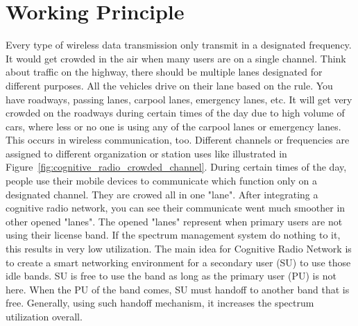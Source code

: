 \section{Working Principle}

Every type of wireless data transmission only transmit in a designated frequency. It would get crowded in the air when many users 
are on a single channel. Think about traffic on the highway, there should be multiple lanes designated for different purposes. 
All the vehicles drive on their lane based on the rule. You have roadways, passing lanes, carpool lanes, emergency lanes, etc. 
It will get very crowded on the roadways during certain times of the day due to high volume of cars, where less or no one is 
using any of the carpool lanes or emergency lanes. This occurs in wireless communication, too. Different channels or frequencies
are assigned to different organization or station uses like illustrated in Figure~\ref{fig:cognitive_radio_crowded_channel}. 
During certain times of the day, people use their mobile devices to communicate which function only on a designated channel.
They are crowed all in one "lane". After integrating a cognitive radio network, you can see their communicate went much smoother
in other opened "lanes". The opened "lanes" represent when primary users are not using their license band. If the spectrum 
management system do nothing to it, this results in very low utilization. The main idea for Cognitive Radio Network is to create
a smart networking environment for a secondary user (SU) to use those idle bands. SU is free to use the band as long as the 
primary user (PU) is not here. When the PU of the band comes, SU must handoff to another band that is free. Generally, using
such handoff mechanism, it increases the spectrum utilization overall. 

